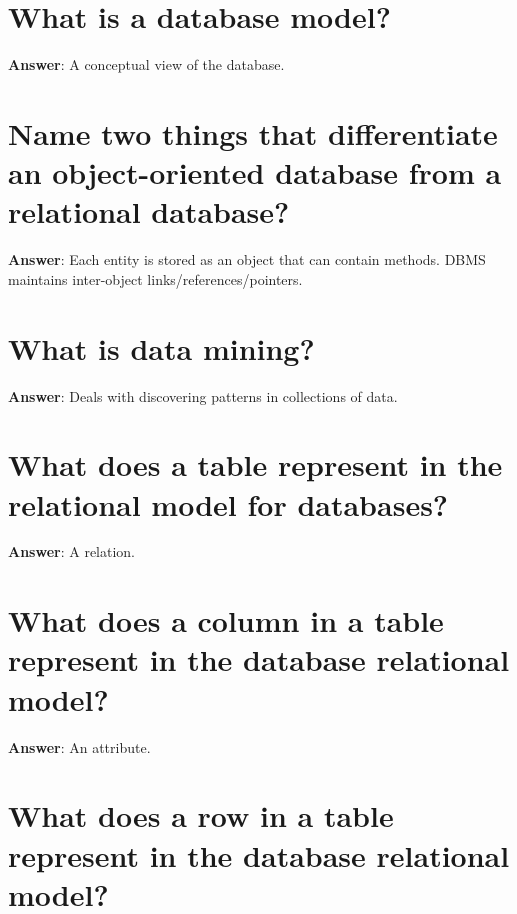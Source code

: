 \documentclass[a4paper,11pt,oneside]{book}
\begin{document}
\begin{sloppypar}
\section{What is a database model?}

\label{q:290:sa:en:True}

\textbf{Answer}: A conceptual view of the database.



\section{Name two things that differentiate an object-oriented database from a relational database?}

\label{q:291:sa:en:True}

\textbf{Answer}: Each entity is stored as an object that can contain methods. DBMS maintains inter-object links/references/pointers.



\section{What is data mining?}

\label{q:292:sa:en:True}

\textbf{Answer}: Deals with discovering patterns in collections of data.



\section{What does a table represent in the relational model for databases?}

\label{q:293:sa:en:True}

\textbf{Answer}: A relation.



\section{What does a column in a table represent in the database relational model?}

\label{q:294:sa:en:True}

\textbf{Answer}: An attribute.



\section{What does a row in a table represent in the database relational model?}


\end{sloppypar}
\end{document}
